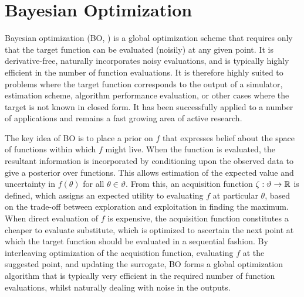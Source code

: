 
\section{Bayesian Optimization}
\label{sec:opt:BO}
Bayesian optimization (BO, \cite{jones1998efficient,osborne2009gaussian,brochu2010tutorial,shahriari2016taking})  is a 
global optimization scheme that requires only that the target
function can be evaluated (noisily) at any given point.  It is derivative-free,
naturally incorporates noisy evaluations, and is typically highly efficient 
in the number of function evaluations.  It is therefore highly suited to
problems where the target function corresponds to the output of a simulator,
estimation scheme, algorithm performance evaluation, or other cases where
the target is not known in closed form.  It has been successfully applied to 
a number of applications  and remains a fast growing area of
active research.

The key idea of BO is to place a prior on $f$ that expresses belief about the space of functions within which $f$ might live.  When the function is evaluated, the resultant information is incorporated by conditioning upon the observed data to give a posterior over functions.  
This allows estimation of the expected value and uncertainty in $f\left(\theta\right)$ for all $\theta \in \vartheta$.  
From this, an acquisition function $\zeta : \vartheta \rightarrow \mathbb{R}$ is defined, which assigns an expected utility to evaluating $f$ at particular $\theta$, based on the trade-off between exploration and exploitation in finding the maximum.  When direct evaluation of $f$ is expensive, the acquisition function constitutes a cheaper to evaluate substitute, which is optimized to ascertain the next point at which the target function should be evaluated in a sequential fashion.  By interleaving optimization of the acquisition function, evaluating $f$ at the suggested point, and updating the surrogate, BO forms a global optimization algorithm that is typically very efficient in the required number of function evaluations, whilst naturally dealing with noise in the outputs.  

